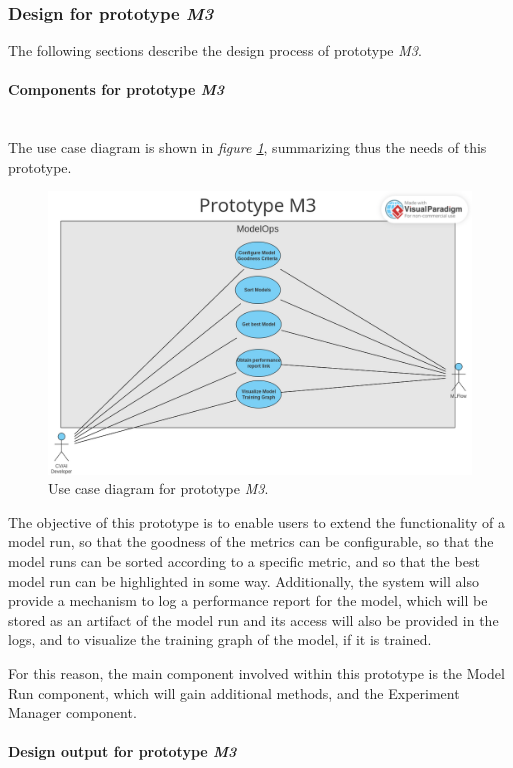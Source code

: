 \subsubsection{Design for prototype \emph{M3}}

The following sections describe the design process of prototype \emph{M3}.

\paragraph{Components for prototype \emph{M3}} \mbox{}\\

The use case diagram is shown in \emph{figure \ref{fig:useCaseM3}}, summarizing thus the needs of this prototype.

\begin{figure}[H]
    \centering
    \includegraphics[width=0.7\linewidth]{figs/use-case-M3.png}
    \caption{Use case diagram for prototype \emph{M3}.}
    \label{fig:useCaseM3}
\end{figure}

The objective of this prototype is to enable users to extend the functionality of a model run, so that the goodness of the metrics can be configurable, so that the 
model runs can be sorted according to a specific metric, and so that the best model run can be highlighted in some way. Additionally, the system will also provide a 
mechanism to log a performance report for the model, which will be stored as an artifact of the model run and its access will also be provided in the logs, and to 
visualize the training graph of the model, if it is trained.

For this reason, the main component involved within this prototype is the Model Run component, which will gain additional methods, and the Experiment Manager component.

\paragraph{Design output for prototype \emph{M3}}\mbox{}\\

